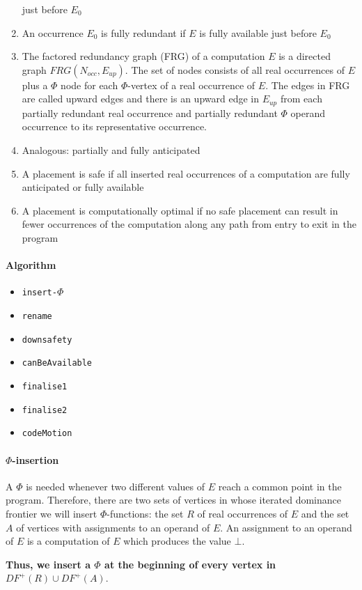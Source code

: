 \documentclass[a4paper,12pt, notitlepage]{article}
\begin{document}
\begin{enumerate}
just before $E_0$
\item An occurrence $E_0$ is fully redundant if $E$ is fully available
just before $E_0$
\item The factored redundancy graph (FRG) of a computation $E$ is a directed
graph $FRG(N_{occ}, E_{up})$. The set of nodes consists of all real occurrences
of $E$ plus a $\Phi$ node for each $\Phi$-vertex of a real occurrence of $E$.
The edges in FRG are called upward edges and there is an upward edge in $E_{up}$
from each partially redundant real occurrence and partially redundant $\Phi$
operand occurrence to its representative occurrence.
\item Analogous: partially and fully anticipated
\item A placement is safe if all inserted real occurrences of a computation are
fully anticipated or fully available
\item A placement is computationally optimal if no safe placement can result in
fewer occurrences of the computation along any path from entry to exit in the
program
\end{enumerate}

\paragraph*{Algorithm} 
\begin{itemize}
\item \texttt{insert-$\Phi$}
\item \texttt{rename}
\item \texttt{downsafety}
\item \texttt{canBeAvailable}
\item \texttt{finalise1}
\item \texttt{finalise2}
\item \texttt{codeMotion}
\end{itemize}
\paragraph*{$\Phi$-insertion}
A $\Phi$ is needed whenever two different values of $E$ reach a common point in
the program. Therefore, there are two sets of vertices in whose iterated
dominance frontier we will insert $\Phi$-functions: the set $R$ of real
occurrences of $E$ and the set $A$ of vertices with assignments to an operand of
$E$. An assignment to an operand of $E$ is a computation of $E$ which produces
the value $\bot$. 

\textbf{Thus, we insert a $\Phi$ at the beginning of every vertex in
$DF^+(R) \cup DF^+(A)$}.
\end{document}

